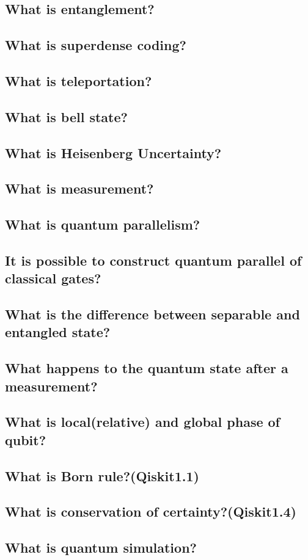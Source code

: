 \subsection{What is entanglement?}

\subsection{What is superdense coding?}

\subsection{What is teleportation?}

\subsection{What is bell state?}

\subsection{What is Heisenberg Uncertainty?}

\subsection{What is measurement?}

\subsection{What is quantum parallelism?}

\subsection{It is possible to construct quantum parallel of classical gates?}

\subsection{What is the difference between separable and entangled state?}

\subsection{What happens to the quantum state after a measurement?}

\subsection{What is local(relative) and global phase of qubit?}

\subsection{What is Born rule?(Qiskit1.1)}

\subsection{What is conservation of certainty?(Qiskit1.4)}

\subsection{What is quantum simulation?}
